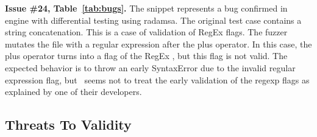\documentclass[smallextended]{svjour3}
\begin{document}





\vspace{1ex}\noindent\textbf{Issue \#24, Table~\ref{tab:bugs}.} The snippet
 represents a bug confirmed in \textbf{\hermes} engine with
differential testing using radamsa.
The original test case contains a string concatenation.
This is a case of validation of RegEx flags. The fuzzer mutates
the file with a regular expression  after the plus operator.
In this case, the plus operator turns into a flag of the RegEx ,
but this flag is not valid. The expected behavior is to throw an early
SyntaxError due to the invalid regular expression flag,
but \hermes\ seems not to treat the early validation of the regexp flags
as explained by one of their developers.

\subsection{Threats To Validity}
\end{document}
